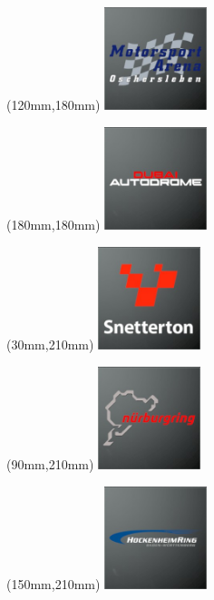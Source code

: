 \begin{textblock*}{30mm}(120mm,180mm)%
\includegraphics[width=30mm]{LG/2015-05-20_00090.png}
\end{textblock*}
\begin{textblock*}{30mm}(180mm,180mm)%
\includegraphics[width=30mm]{LG/2015-05-20_00081.png}
\end{textblock*}
\begin{textblock*}{30mm}(30mm,210mm)%
\includegraphics[width=30mm]{LG/2015-05-20_00095.png}
\end{textblock*}
\begin{textblock*}{30mm}(90mm,210mm)%
\includegraphics[width=30mm]{LG/2015-05-20_00089.png}
\end{textblock*}
\begin{textblock*}{30mm}(150mm,210mm)%
\includegraphics[width=30mm]{LG/2015-05-20_00082.png}
\end{textblock*}
